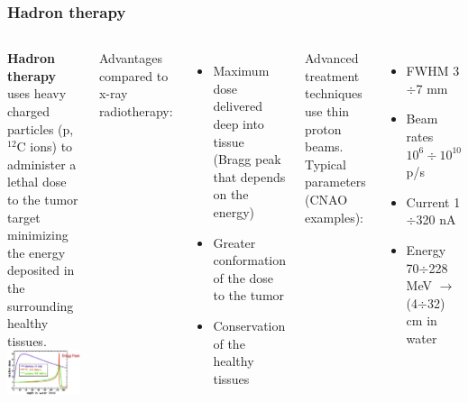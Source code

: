 \documentclass[aspectratio=169]{beamer}
\begin{document}
	\begin{frame}
	\frametitle{Hadron therapy}
		\begin{columns}
		\begin{center}
			\textbf{Hadron therapy} uses heavy charged particles (p, ${}^{12}$C ions) to administer a lethal dose to the tumor target minimizing the energy deposited in the surrounding healthy tissues.
			\includegraphics[width=0.95 \textwidth]{IMG/Bragg_Peak.PNG}
		\end{center}
		
			{\color{blue} Advantages compared to x-ray radiotherapy:}
			\begin{itemize}
				\item Maximum dose delivered deep into tissue (Bragg peak that depends on the energy)
				\item Greater conformation of the dose to the tumor
				\item Conservation of the healthy tissues 
			\end{itemize}
		\vspace{1 cm}
			{\color{blue} Advanced treatment techniques use thin proton beams. \\ Typical parameters (CNAO examples):}
			\begin{itemize}
				\item FWHM 3$\div$7 mm
				\item Beam rates $10^6\div10^{10}$ p/s
				\item Current  1$\div$320 nA
				\item Energy  70$\div$228 MeV $\rightarrow$ (4$\div$32) cm in water
			\end{itemize}
		
		\end{columns}
	\end{frame}
\end{document}
